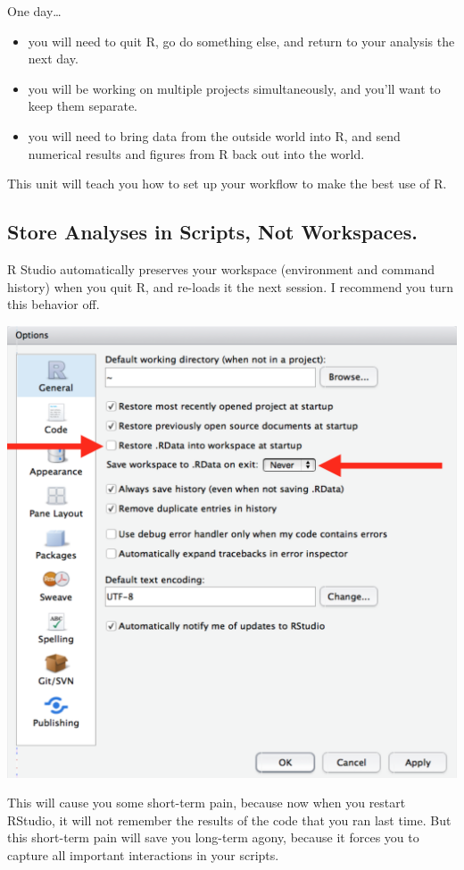 \documentclass[]{book}
\providecommand{\tightlist}{%
  \setlength{\itemsep}{0pt}\setlength{\parskip}{0pt}}
\begin{document}
One day\ldots{}

\begin{itemize}
\tightlist
\item
  you will need to quit R, go do something else, and return to your
  analysis the next day.
\item
  you will be working on multiple projects simultaneously, and you'll
  want to keep them separate.
\item
  you will need to bring data from the outside world into R, and send
  numerical results and figures from R back out into the world.
\end{itemize}

This unit will teach you how to set up your workflow to make the best
use of R.

\subsection{Store Analyses in Scripts, Not
Workspaces.}\label{store-analyses-in-scripts-not-workspaces.}

R Studio automatically preserves your workspace (environment and command
history) when you quit R, and re-loads it the next session. I recommend
you turn this behavior off.

\begin{center}\includegraphics[width=0.7\linewidth]{img/rstudio-workspace} \end{center}

This will cause you some short-term pain, because now when you restart
RStudio, it will not remember the results of the code that you ran last
time. But this short-term pain will save you long-term agony, because it
forces you to capture all important interactions in your scripts.
\end{document}
